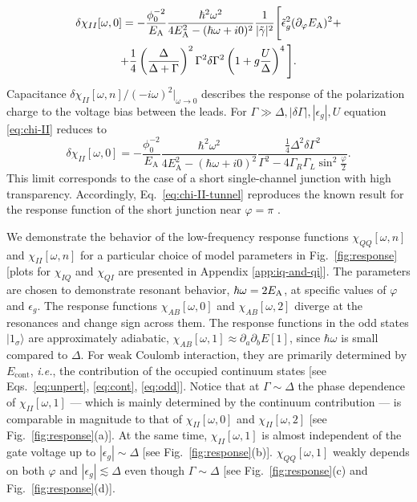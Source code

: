 \documentclass[aps,reprint,longbibliography, prb]{revtex4-2}
\begin{document}
\begin{gather}
    \notag\delta\chi_{II}[\omega,0] =-\frac{\phi_0^{-2}}{E_\mathrm{A}} \frac{\hbar^2\omega^2}{4E_\mathrm{A}^2-(\hbar\omega+i0)^2}\frac{1}{|\tilde{\gamma}|^2}\Bigg[\tilde{\epsilon}_g^2 (\partial_\varphi E_\mathrm{A})^2 + \\   +\frac{1}{4}\left(\frac{\Delta}{\Delta+\Gamma}\right)^2 \Gamma^2\delta\Gamma^2\left(1+g \frac{U}{\Delta}\right)^4\Bigg].
    \label{eq:chi-II}
\end{gather}
Capacitance $\delta\chi_{II}[\omega,n]/(-i\omega)^2|_{\omega \rightarrow 0}$ describes the response of {the polarization charge to the voltage bias between the leads}. 
For $\Gamma\gg\Delta,|\delta\Gamma|,|\epsilon_g|, U$ equation \eqref{eq:chi-II} reduces to
\begin{equation}
\delta\chi_{II}[\omega,0] =-\frac{\phi_0^{-2}}{E_\mathrm{A}} \frac{\hbar^2\omega^2}{4E_\mathrm{A}^2-(\hbar\omega+i0)^2}\frac{\frac{1}{4}\Delta^2\delta\Gamma^2}{\Gamma^2 - 4\Gamma_R \Gamma_L \sin^2\frac{\varphi}{2}}.
\label{eq:chi-II-tunnel}
\end{equation}
This limit corresponds to the case of a short single-channel junction with high transparency. Accordingly, Eq.~\eqref{eq:chi-II-tunnel} reproduces the known result for the response function of the short junction near $\varphi = \pi$ \cite{kos2013}.

{We demonstrate the behavior of the low-frequency response functions $\chi_{QQ}[\omega, n]$ and $\chi_{II}[\omega, n]$ for a particular choice of model parameters in Fig.~\ref{fig:response} [plots for $\chi_{IQ}$ and $\chi_{QI}$ are presented in Appendix \ref{app:iq-and-qi}]. The parameters are chosen to demonstrate resonant behavior, $\hbar\omega = 2 E_{\rm A}$, at specific values of $\varphi$ and $\epsilon_g$. The response functions $\chi_{AB}[\omega, 0]$ and $\chi_{AB}[\omega, 2]$ diverge at the resonances and change sign across them. The response functions in the odd states $|1_\sigma\rangle$ are approximately adiabatic, $\chi_{AB}[\omega, 1] \approx \partial_a \partial_b E[1]$, since $\hbar\omega$ is small compared to $\Delta$. For weak Coulomb interaction, they are primarily determined by $E_\mathrm{cont}$, \textit{i.e.}, the contribution of the occupied continuum states [see Eqs.~\eqref{eq:unpert}, \eqref{eq:cont}, \eqref{eq:odd}]. Notice that at $\Gamma\sim \Delta$ the phase dependence of $\chi_{II}[\omega,1]$ --- which is mainly determined by the continuum contribution --- is comparable in magnitude to that of $\chi_{II}[\omega, 0]$ and $\chi_{II}[\omega, 2]$ [see Fig.~\ref{fig:response}(a)]. At the same time, $\chi_{II}[\omega,1]$ is almost independent of the gate voltage up to $|\epsilon_g| \sim \Delta$ [see Fig.~\ref{fig:response}(b)]. $\chi_{QQ}[\omega,1]$ weakly depends on both $\varphi$ and $|\epsilon_g|\lesssim \Delta$ even though $\Gamma \sim \Delta$ [see Fig.~\ref{fig:response}(c) and Fig.~\ref{fig:response}(d)].}
\end{document}
